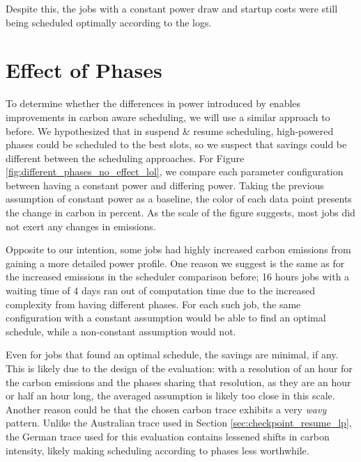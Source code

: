 Despite this, the jobs with a constant power draw and startup costs were still being scheduled optimally according to the logs. 



\section{Effect of Phases}

To determine whether the differences in power introduced by \modelname{} enables improvements in carbon aware scheduling, we will use a similar approach to before. We hypothesized that in suspend \& resume scheduling, high-powered phases could be scheduled to the best slots, so we suspect that savings could be different between the scheduling approaches. For Figure \ref{fig:different_phases_no_effect_lol}, we compare each parameter configuration between having a constant power and differing power. Taking the previous assumption of constant power as a baseline, the color of each data point presents the change in carbon in percent. As the scale of the figure suggests, most jobs did not exert any changes in emissions. 

Opposite to our intention, some jobs had highly increased carbon emissions from gaining a more detailed power profile.
One reason we suggest is the same as for the increased emissions in the scheduler comparison before; 16 hours jobs with a waiting time of 4 days ran out of computation time due to the increased complexity from having different phases. 
For each such job, the same configuration with a constant assumption would be able to find an optimal schedule, while a non-constant assumption would not.

Even for jobs that found an optimal schedule, the savings are minimal, if any. 
This is likely due to the design of the evaluation: with a resolution of an hour for the carbon emissions and the phases sharing that resolution, as they are an hour or half an hour long, the averaged assumption is likely too close in this scale. Another reason could be that the chosen carbon trace exhibits a very \emph{wavy} pattern. Unlike the Australian trace used in Section \ref{sec:checkpoint_resume_lp}, the German trace used for this evaluation contains lessened shifts in carbon intensity, likely making scheduling according to phases less worthwhile.

